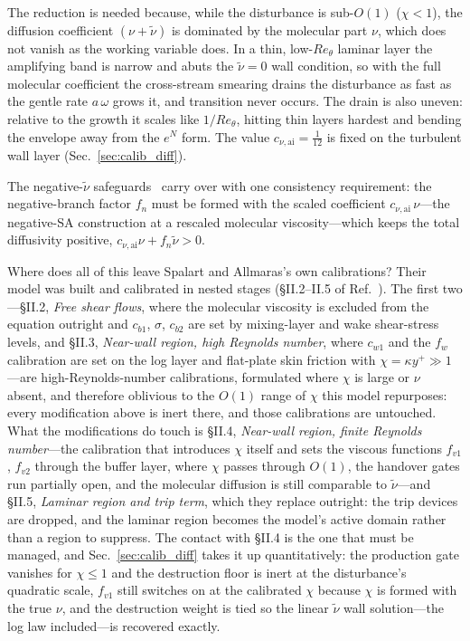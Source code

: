 \documentclass[journal]{new-aiaa}
\begin{document}
The reduction is needed because, while the disturbance is sub-$O(1)$
($\chi\!<\!1$), the diffusion coefficient $(\nu+\tilde\nu)$ is dominated by the
molecular part $\nu$, which does not vanish as the working variable does. In a
thin, low-$Re_\theta$ laminar layer the amplifying band is narrow and abuts the
$\tilde\nu\!=\!0$ wall condition, so with the full molecular coefficient the
cross-stream smearing drains the disturbance as fast as the gentle rate
$a\,\omega$ grows it, and transition never occurs. The drain is also
uneven: relative to the growth it scales like $1/Re_\theta$, hitting thin
layers hardest and bending the envelope away from the $e^N$ form. The value
$c_{\nu,\mathrm{ai}}=\tfrac{1}{12}$ is fixed on the turbulent wall layer
(Sec.~\ref{sec:calib_diff}).

The negative-$\tilde\nu$ safeguards~\cite{allmaras_2012} carry over with
one consistency requirement: the negative-branch factor $f_n$ must be
formed with the scaled coefficient
$c_{\nu,\mathrm{ai}}\,\nu$---the negative-SA construction at a rescaled
molecular viscosity---which keeps the total diffusivity positive,
$c_{\nu,\mathrm{ai}}\nu + f_n\tilde\nu\!>\!0$.

Where does all of this leave Spalart and Allmaras's own calibrations?
Their model was built and calibrated in nested stages
(\S II.2--II.5 of Ref.~\cite{spalart_allmaras_1994}). The first
two---\S II.2, \emph{Free shear flows}, where the molecular viscosity
is excluded from the equation outright and $c_{b1}$, $\sigma$, $c_{b2}$
are set by mixing-layer and wake shear-stress levels, and \S II.3,
\emph{Near-wall region, high Reynolds number}, where $c_{w1}$ and the
$f_w$ calibration are set on the log layer and flat-plate skin friction
with $\chi\!=\!\kappa y^+\!\gg\!1$---are high-Reynolds-number
calibrations, formulated where $\chi$ is large or $\nu$ absent, and
therefore oblivious to the $O(1)$ range of $\chi$ this model
repurposes: every modification above is inert there, and those
calibrations are untouched. What the modifications do touch is \S II.4,
\emph{Near-wall region, finite Reynolds number}---the calibration that
introduces $\chi$ itself and sets the viscous functions $f_{v1}$,
$f_{v2}$ through the buffer layer, where $\chi$ passes through $O(1)$,
the handover gates run partially open, and the molecular diffusion is
still comparable to $\tilde\nu$---and \S II.5, \emph{Laminar region
and trip term}, which they replace outright: the trip devices are
dropped, and the laminar region becomes the model's active domain
rather than a region to suppress. The contact with \S II.4 is the one
that must be managed, and Sec.~\ref{sec:calib_diff} takes it up
quantitatively: the production gate vanishes for $\chi\!\le\!1$ and the
destruction floor is inert at the disturbance's quadratic scale, $f_{v1}$
still switches on at the calibrated $\chi$ because $\chi$ is formed with
the true $\nu$, and the destruction weight is tied so the linear
$\tilde\nu$ wall solution---the log law included---is recovered exactly.
\end{document}
